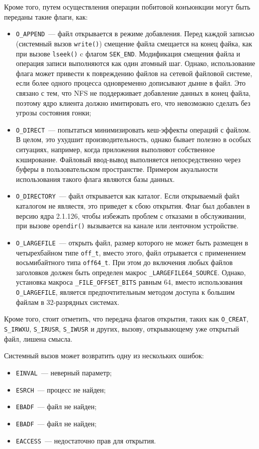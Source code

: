 Кроме того, путем осуществления операции побитовой конъюнкции могут быть
переданы такие флаги, как:
\begin{itemize}
\item \texttt{O\_APPEND}~--- файл открывается в режиме добавления. Перед каждой
  записью (системный вызов \texttt{write()}) смещение файла смещается на конец
  файка, как при вызове \texttt{lseek()} c флагом \texttt{SEK\_END}. Модификация
  смещения файла и операция записи выполняются как один атомный шаг. Однако,
  использование флага может привести к повреждению файлов на сетевой файловой
  системе, если более одного процесса одновременно дописывают дынне в файл. Это
  связано с тем, что NFS не поддерживает добавление данных в конец файла,
  поэтому ядро клиента должно имитировать его, что невозможно сделать без угрозы
  состояния гонки;
\item \texttt{O\_DIRECT}~--- попытаться минимизировать кеш-эффекты операций с
  файлом. В целом, это ухудшит производительность, однако бывает полезно в
  особых ситуациях, например, когда приложения выполняют собственное
  кэширование. Файловый ввод-вывод выполняется непосредственно через буферы в
  пользовательском пространстве. Примером акуальности использования такого флага
  являются базы данных.
\item \texttt{O\_DIRECTORY}~--- файл открывается как каталог. Если открываемый
  файл каталогом не являестя, это приведет к сбою открытия. Флаг был добавлен в
  версию ядра 2.1.126, чтобы избежать проблем с отказами в обслуживании, при
  вызове \texttt{opendir()} вызывается на канале или ленточном устройстве.
\item \texttt{O\_LARGEFILE}~--- открыть файл, размер которого не может быть
  размещен в четырехбайном типе \texttt{off\_t}, вместо этого, файл отрывается с
  применением восьмибайтного типа \texttt{off64\_t}. При этом до включения любых
  файлов заголовков должен быть определен макрос \texttt{\_LARGEFILE64\_SOURCE}.
  Однако, установка макроса \texttt{\_FILE\_OFFSET\_BITS} равным 64, вместо
  использования \texttt{O\_LARGEFILE}, является предпочтительным методом доступа
  к большим файлам в 32-разрядных системах.
\end{itemize}

Кроме того, стоит отметить, что передача флагов открытия, таких как
\texttt{O\_CREAT}, \texttt{S\_IRWXU}, \texttt{S\_IRUSR}, \texttt{S\_IWUSR} и
других, вызову, открывающему уже открытый файл, лишена смысла.

Системный вызов может возвратить одну из нескольких ошибок:
\begin{itemize}
\item \texttt{EINVAL}~--- неверный параметр;
\item \texttt{ESRCH}~--- процесс не найден;
\item \texttt{EBADF}~--- файл не найден;
\item \texttt{EBADF}~--- файл не найден;
\item \texttt{EACCESS}~--- недостаточно прав для открытия.
\end{itemize}

